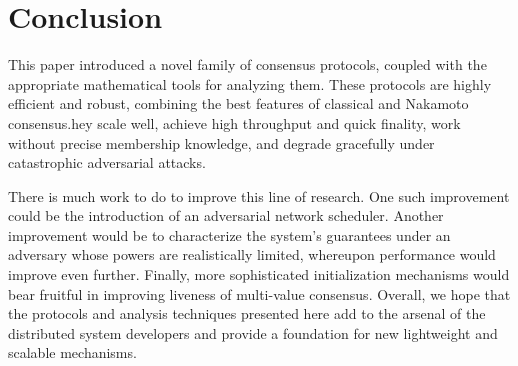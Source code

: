 \documentclass[letterpaper,twocolumn,10pt]{article}
\newcommand{\tronly}[2]{#1}
\theoremstyle{definition}
\begin{document}
\section{Conclusion}
\label{sec:conclusions}
This paper introduced a novel family of consensus protocols, coupled with the appropriate mathematical tools for analyzing them.
\tronly{These protocols are highly efficient and robust, combining the best features of classical and Nakamoto consensus.}
They scale well, achieve high throughput and quick finality, work without precise membership knowledge, and degrade gracefully under catastrophic adversarial attacks.

There is much work to do to improve this line of research. \tronly{
One such improvement could be the introduction of an adversarial network scheduler.
Another}{One} improvement would be to characterize the system's guarantees under an adversary whose powers are realistically limited, whereupon performance would improve even further. \tronly{Finally, more}{More} sophisticated initialization mechanisms would bear fruitful in improving liveness of multi-value consensus.
Overall, we hope that the protocols and analysis techniques presented here add to the arsenal of the distributed system developers and provide a foundation for new lightweight and scalable mechanisms.

\end{document}
